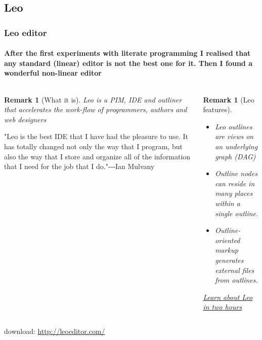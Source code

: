 \documentclass{beamer}
\newtheorem{remark}[theorem]{Remark}
\begin{document}
\subsection{Leo}
\frame
{
  \frametitle{Leo editor}
  \framesubtitle{After the first experiments with literate programming I realised that any standard (linear) editor is not the best one for it. {\bf Then I found a wonderful non-linear editor}}
  \footnotesize

\begin{columns}
	\begin{column}{6cm}
\begin{remark}[What it is]
Leo is a \alert{PIM}, \alert{IDE} and \alert{outliner} that accelerates the work-flow of programmers, authors and web designers
\end{remark}

\vspace{5mm}

"Leo is the best IDE that I have had the pleasure to use. It has totally changed not only the way that I program, but also the way that I store and organize all of the information that I need for the job that I do."―Ian Mulvany
	\end{column}
\pause
	\begin{column}{6cm}
\begin{remark}[Leo features]
\begin{itemize}
\item 
\emph{Leo outlines} are views on an underlying \alert{graph} (DAG)
\item 
Outline \emph{nodes} can \alert{reside in many places} within a single outline.
\item 
\emph{Outline-oriented markup} generates \alert{external files} from outlines.
\end{itemize}
\end{remark}

\vspace{3mm}
\href{http://leoeditor.com/tutorial.html}{\emph{Learn about Leo in two hours}}


	\end{column}
\end{columns}

\centering\vfill
download: \href{http://leoeditor.com/}{\alert{http://leoeditor.com/}}

}
\end{document}
